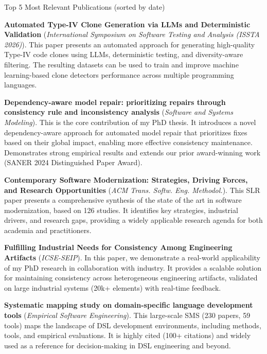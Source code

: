 \begin{rubric}{Top 5 Most Relevant Publications (sorted by date)}

\entry*[2026] \textbf{Automated Type-IV Clone Generation via LLMs and Deterministic Validation} (\emph{International Symposium on Software Testing and Analysis (ISSTA 2026)}). 
This paper presents an automated approach for generating high-quality Type-IV code clones using LLMs, deterministic testing, and diversity-aware filtering. The resulting datasets can be used to train and improve machine learning-based clone detectors performance across multiple programming languages.

\entry*[2026] \textbf{Dependency-aware model repair: prioritizing repairs through consistency rule and inconsistency analysis} (\emph{Software and Systems Modeling}). 
This is the core contribution of my PhD thesis. It introduces a novel dependency-aware approach for automated model repair that prioritizes fixes based on their global impact, enabling more effective consistency maintenance. Demonstrates strong empirical results and extends our prior award-winning work (SANER 2024 Distinguished Paper Award).

\entry*[2024] \textbf{Contemporary Software Modernization: Strategies, Driving Forces, and Research Opportunities} (\emph{ACM Trans. Softw. Eng. Methodol.}). 
This SLR paper presents a comprehensive synthesis of the state of the art in software modernization, based on 126 studies. It identifies key strategies, industrial drivers, and research gaps, providing a widely applicable research agenda for both academia and practitioners.

\entry*[2023] \textbf{Fulfilling Industrial Needs for Consistency Among Engineering Artifacts} (\emph{ICSE-SEIP}). 
In this paper, we demonstrate a real-world applicability of my PhD research in collaboration with industry. It provides a scalable solution for maintaining consistency across heterogeneous engineering artifacts, validated on large industrial systems (20k+ elements) with real-time feedback.


\entry*[2020] \textbf{Systematic mapping study on domain-specific language development tools} (\emph{Empirical Software Engineering}). 
This large-scale SMS (230 papers, 59 tools) maps the landscape of DSL development environments, including methods, tools, and empirical evaluations. It is highly cited (100+ citations) and widely used as a reference for decision-making in DSL engineering and beyond.

\end{rubric}